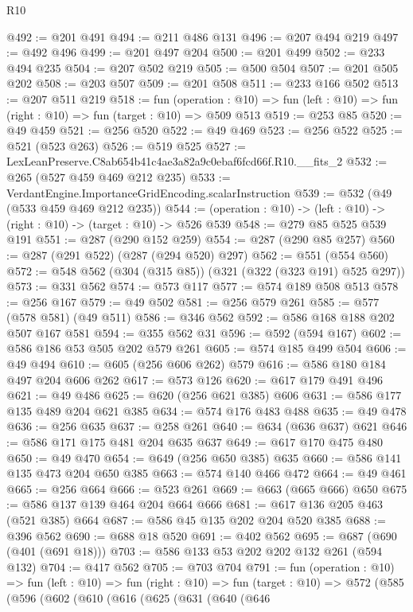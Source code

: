 \begin{lexlean}{R10}
\begin{coremodule}
@492 := @201 @491
@494 := @211 @486 @131
@496 := @207 @494 @219
@497 := @492 @496
@499 := @201 @497 @204
@500 := @201 @499
@502 := @233 @494 @235
@504 := @207 @502 @219
@505 := @500 @504
@507 := @201 @505 @202
@508 := @203 @507
@509 := @201 @508
@511 := @233 @166 @502
@513 := @207 @511 @219
@518 := fun (operation : @10) =>
  fun (left : @10) => fun (right : @10) => fun (target : @10) => @509 @513
@519 := @253 @85
@520 := @49 @459
@521 := @256 @520
@522 := @49 @469
@523 := @256 @522
@525 := @521 (@523 @263)
@526 := @519 @525
@527 := LexLeanPreserve.C8ab654b41c4ae3a82a9c0ebaf6fcd66f.R10.__fits_2
@532 := @265 (@527 @459 @469 @212 @235)
@533 := VerdantEngine.ImportanceGridEncoding.scalarInstruction
@539 := @532 (@49 (@533 @459 @469 @212 @235))
@544 := (operation : @10) -> (left : @10) -> (right : @10) -> (target : @10) -> @526 @539
@548 := @279 @85 @525 @539 @191
@551 := @287 (@290 @152 @259)
@554 := @287 (@290 @85 @257)
@560 := @287 (@291 @522) (@287 (@294 @520) @297)
@562 := @551 (@554 @560)
@572 := @548 @562 (@304 (@315 @85)) (@321 (@322 (@323 @191) @525 @297))
@573 := @331 @562
@574 := @573 @117
@577 := @574 @189 @508 @513
@578 := @256 @167
@579 := @49 @502
@581 := @256 @579 @261
@585 := @577 (@578 @581) (@49 @511)
@586 := @346 @562
@592 := @586 @168 @188 @202 @507 @167 @581
@594 := @355 @562 @31
@596 := @592 (@594 @167)
@602 := @586 @186 @53 @505 @202 @579 @261
@605 := @574 @185 @499 @504
@606 := @49 @494
@610 := @605 (@256 @606 @262) @579
@616 := @586 @180 @184 @497 @204 @606 @262
@617 := @573 @126
@620 := @617 @179 @491 @496
@621 := @49 @486
@625 := @620 (@256 @621 @385) @606
@631 := @586 @177 @135 @489 @204 @621 @385
@634 := @574 @176 @483 @488
@635 := @49 @478
@636 := @256 @635
@637 := @258 @261
@640 := @634 (@636 @637) @621
@646 := @586 @171 @175 @481 @204 @635 @637
@649 := @617 @170 @475 @480
@650 := @49 @470
@654 := @649 (@256 @650 @385) @635
@660 := @586 @141 @135 @473 @204 @650 @385
@663 := @574 @140 @466 @472
@664 := @49 @461
@665 := @256 @664
@666 := @523 @261
@669 := @663 (@665 @666) @650
@675 := @586 @137 @139 @464 @204 @664 @666
@681 := @617 @136 @205 @463 (@521 @385) @664
@687 := @586 @45 @135 @202 @204 @520 @385
@688 := @396 @562
@690 := @688 @18 @520
@691 := @402 @562
@695 := @687 (@690 (@401 (@691 @18)))
@703 := @586 @133 @53 @202 @202 @132 @261 (@594 @132)
@704 := @417 @562
@705 := @703 @704
@791 := fun (operation : @10) =>
  fun (left : @10) =>
  fun (right : @10) =>
  fun (target : @10) =>
  @572
    (@585
      (@596
        (@602
          (@610
            (@616
              (@625
                (@631
                  (@640
                    (@646

\end{coremodule}
\end{lexlean}
